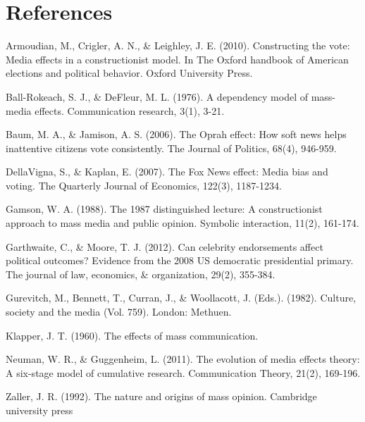 \documentclass[11pt,]{article}
\begin{document}
\section{References}\label{references}

Armoudian, M., Crigler, A. N., \& Leighley, J. E. (2010). Constructing
the vote: Media effects in a constructionist model. In The Oxford
handbook of American elections and political behavior. Oxford University
Press.

Ball-Rokeach, S. J., \& DeFleur, M. L. (1976). A dependency model of
mass-media effects. Communication research, 3(1), 3-21.

Baum, M. A., \& Jamison, A. S. (2006). The Oprah effect: How soft news
helps inattentive citizens vote consistently. The Journal of Politics,
68(4), 946-959.

DellaVigna, S., \& Kaplan, E. (2007). The Fox News effect: Media bias
and voting. The Quarterly Journal of Economics, 122(3), 1187-1234.

Gamson, W. A. (1988). The 1987 distinguished lecture: A constructionist
approach to mass media and public opinion. Symbolic interaction, 11(2),
161-174.

Garthwaite, C., \& Moore, T. J. (2012). Can celebrity endorsements
affect political outcomes? Evidence from the 2008 US democratic
presidential primary. The journal of law, economics, \& organization,
29(2), 355-384.

Gurevitch, M., Bennett, T., Curran, J., \& Woollacott, J. (Eds.).
(1982). Culture, society and the media (Vol. 759). London: Methuen.

Klapper, J. T. (1960). The effects of mass communication.

Neuman, W. R., \& Guggenheim, L. (2011). The evolution of media effects
theory: A six-stage model of cumulative research. Communication Theory,
21(2), 169-196.

Zaller, J. R. (1992). The nature and origins of mass opinion. Cambridge
university press




\end{document}
